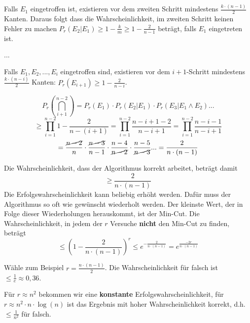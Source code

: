 \documentclass{scrartcl}%
\begin{document}
    Falls $E_1$ eingetroffen ist, existieren vor dem zweiten Schritt mindestens $\frac{k \cdot (n-1)}{2}$ Kanten.
    Daraus folgt dass die Wahrscheinlichkeit, im zweiten Schritt keinen Fehler zu machen
    $P_r(E_2 | E_1) \geq 1 - \frac{k}{m} \geq 1 - \frac{2}{n-1}$ beträgt, falls $E_1$ eingetreten ist.

    ...

    Falls $E_1, E_2, ..., E_i$ eingetroffen sind, existieren vor dem $i+1$-Schritt mindestens $\frac{k \cdot (n-i)}{2}$ Kanten:
    $P_r(E_{i+1})  \geq 1 - \frac{2}{n-i}$.
    \newpage

    \begin{equation*}
        P_r(\bigcap_{i+1}^{n-2}) = P_r(E_1) \cdot P_r(E_2|E_1) \cdot P_r(E_3| E_1 \land E_2) ...
    \end{equation*}
    \begin{equation*}
        \geq \prod_{i=1}^{n-2}1-\frac{2}{n - (i+1)} = \prod_{i=1}^{n-2}\frac{n-i+1-2}{n-i+1} = \prod_{i=1}^{n-2}\frac{n-i-1}{n-i+1}
    \end{equation*}
    \begin{equation*}
        = \frac{\cancel{n-2}}{n} \cdot \frac{\cancel{n-3}}{n-1} \cdot \frac{n-4}{\cancel{n-2}} \cdot \frac{n-5}{\cancel{n-3}} ... = \frac{2}{n \cdot (n-1)}
    \end{equation*}

    Die Wahrscheinlichkeit, dass der Algorithmus korrekt arbeitet, beträgt damit
    \begin{equation*}
        \geq \frac{2}{n \cdot (n-1)}
    \end{equation*}
    Die Erfolgswahrscheinlichkeit kann beliebig erhöht werden.
    Dafür muss der Algorithmus so oft wie gewünscht wiederholt werden.
    Der kleinste Wert, der in Folge dieser Wiederholungen herauskommt, ist der Min-Cut.
    Die Wahrscheinlichkeit, in jedem der $r$ Versuche \textbf{nicht}
    den Min-Cut zu finden, beträgt
    \begin{equation*}
        \leq (1 - \frac{2}{n \cdot (n-1)})^r \leq e^{-\frac{2}{n \cdot (n-1)}} = e^{\frac{-2r}{n \cdot (n-1)}}
    \end{equation*}

    Wähle zum Beispiel $r = \frac{n \cdot (n-1)}{2}$.
    Die Wahrscheinlichkeit für falsch ist $\leq \frac{1}{e} \approx 0,36$.

    Für $r \approx n^2$ bekommen wir eine \textbf{konstante} Erfolgswahrscheinlichkeit,
    für $r \approx n^2 \cdot n \cdot \log(n)$ ist das Ergebnis mit hoher Wahrscheinlichkeit korrekt, d.h. $\leq \frac{1}{n^2}$ für falsch.
\end{document}
